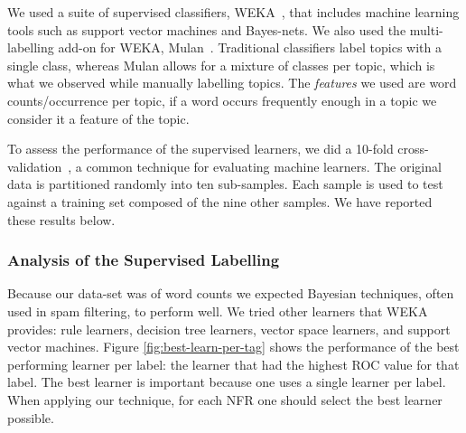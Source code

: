 \documentclass[smallextended]{svjour3}       %
\begin{document}
We used a suite of supervised classifiers, WEKA~\cite{weka09},
that includes machine learning tools such as support vector machines and Bayes-nets. 
We also used the multi-labelling add-on for WEKA, Mulan~\cite{mulan}. %
Traditional classifiers label topics with a single class, whereas Mulan allows for a mixture of classes per topic, which is what we observed while
manually labelling topics.
The \emph{features} we used are word counts/occurrence	per topic, if
a word occurs frequently enough in a topic we consider it a feature of
the topic.

To assess the performance of the supervised learners, we did a 10-fold cross-validation~\cite{Kohavi1995}, a common technique for evaluating machine
learners. 
The original data is partitioned randomly into ten sub-samples. Each sample is used to test against a training set composed of the nine other samples.
We have reported these results below.%

\subsubsection{Analysis of the Supervised Labelling}
Because our data-set was of word counts we expected Bayesian techniques, often used in spam filtering, to perform well. 
We tried other learners that WEKA~\cite{weka09} provides: rule learners, decision tree learners, vector space learners, and support vector machines.  
Figure \ref{fig:best-learn-per-tag} shows the performance of the best
performing learner per label: 
the learner that had the highest ROC value for that label. 
The best learner is important because one uses a single learner per
label. When applying our technique, for each NFR one should select the best learner possible.
\end{document}
